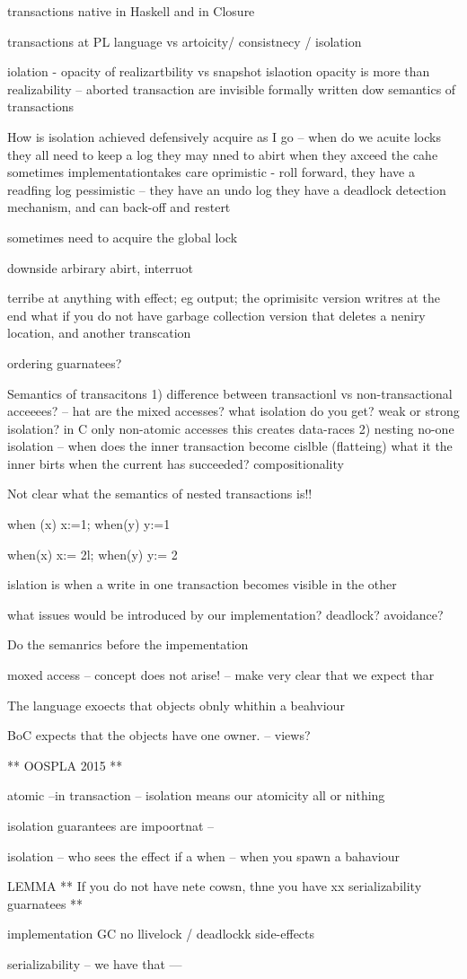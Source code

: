 

transactions native in Haskell and in Closure


transactions at PL language vs artoicity/ consistnecy / isolation

iolation - opacity of realizartbility vs snapshot islaotion 
		opacity is more than realizability -- aborted transaction are invisible 
		formally written dow semantics of transactions
		
How is isolation achieved
defensively acquire as I go -- when do we acuite locks 
	they all need to keep a log 
			they may nned to abirt when they axceed the cahe
	sometimes implementationtakes care 
	oprimistic - roll forward, they have a readfing log
	pessimistic -- they have an undo log 
		they have a deadlock detection mechanism, and can back-off and restert

sometimes need to acquire the global lock

downside arbirary abirt, interruot

terribe at
	anything with effect; eg output; the oprimisitc version writres at the end
				what if you do not have garbage collection	
version that deletes a neniry location, and another transcation	
		
ordering guarnatees?


Semantics of transacitons
	1) difference between transactionl vs non-transactional acceeees? -- hat are the mixed accesses?
			what isolation do you get? weak or strong isolation?
			in C only non-atomic accesses this creates data-races
	2) nesting 
			no-one 
			isolation -- when does the inner transaction become cislble (flatteing)
			what it the inner birts when the current has succeeded?
			compositionality
			
Not clear what the semantics of nested transactions is!!

when (x){ x:=1; when(y){ y:=1 }}

when(x){ x:= 2l; when(y){ y:= 2 }}

islation is when a write in one transaction becomes visible in the other

what issues would be introduced by our implementation?
	deadlock? avoidance? 
	
Do the semanrics before the impementation

moxed access -- concept does not arise!
	-- make very clear that we expect thar 
	
	
The language exoects that objects obnly whithin a beahviour 

BoC expects that the objects have one owner. -- views?

** OOSPLA 2015 **

atomic --in transaction -- isolation means our atomicity 
all or nithing 

isolation guarantees are impoortnat -- 

isolation -- who sees the effect if a when -- when you spawn a bahaviour 

LEMMA ** If you do not have nete cowsn, thne you have xx serializability guarnatees **

implementation
	GC 
	no llivelock / deadlockk
	side-effects
	
serializability -- we have that --- 